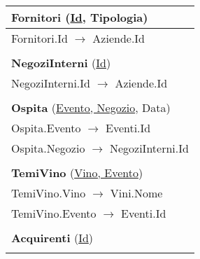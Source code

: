 \begin{center}
\begin{minipage}[t]{7.5cm}
{\begin{tabular}{P{7.5cm}}
				 \textbf{Fornitori} (\underline{Id}, Tipologia)                              \\
				\midrule
				Fornitori.Id $\to$ Aziende.Id                                                                                \\                                \\
				\midrule

				 \textbf{NegoziInterni} (\underline{Id})                                     \\
				\midrule
				NegoziInterni.Id $\to$ Aziende.Id                                                                            \\                                \\
				\midrule

				 \textbf{Ospita} (\underline{Evento, Negozio}, Data)                                                    \\
				\midrule
				Ospita.Evento $\to$ Eventi.Id\\
				\midrule
	Ospita.Negozio $\to$ NegoziInterni.Id                                                                                                                \\                                \\
				\midrule

				 \textbf{TemiVino} (\underline{Vino, Evento})                                                    \\
				\midrule
				TemiVino.Vino $\to$ Vini.Nome\\
				\midrule
	TemiVino.Evento $\to$ Eventi.Id                                                                                                                \\                                \\
				\midrule

				 \textbf{Acquirenti} (\underline{Id})                                                                                                              \\                                \\
				\midrule


\end{tabular}}
\end{minipage}
\end{center}
